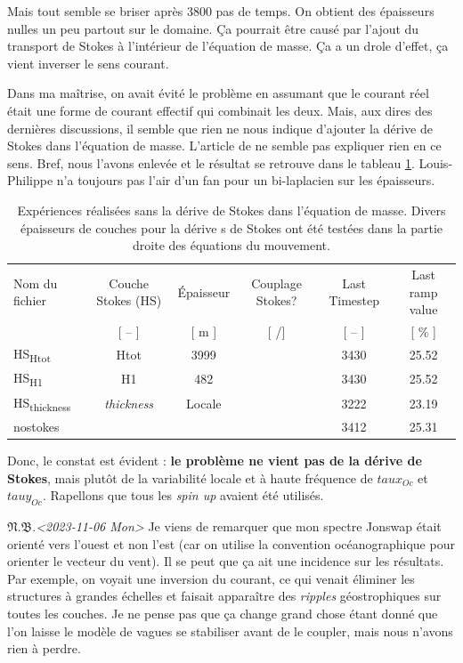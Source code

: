 \documentclass[10pt]{article}
\numberwithin{equation}{section}
\newcommand{\pt}{\hspace{1pt}} %
\newcommand{\nb}{\underline{{\footnotesize\EightStarConvex}\pt $\mathfrak{N.B.}$\vphantom{p}}\hspace{3pt}}
\newcommand{\cmark}{\ding{52}}
\newcommand{\xmark}{\ding{55}}
\begin{document}
Mais tout semble se briser après 3800 pas de temps.
On obtient des épaisseurs nulles un peu partout sur le domaine.
Ça pourrait être causé par l'ajout du transport de Stokes à l'intérieur de l'équation de masse.
Ça a un drole d'effet, ça vient inverser le sens courant. \bigskip

Dans ma maîtrise, on avait évité le problème en assumant que le courant réel était une forme de courant effectif qui combinait les deux.
Mais, aux dires des dernières discussions, il semble que rien ne nous indique d'ajouter la dérive de Stokes dans l'équation de masse.
L'article de \Textcite{suzuki2016understanding} ne semble pas expliquer rien en ce sens.
Bref, nous l'avons enlevée et le résultat se retrouve dans le tableau \ref{tab:org231c57c}.
Louis-Philippe n'a toujours pas l'air d'un fan pour un bi-laplacien sur les épaisseurs.

\begin{table}[htbp]
\caption{\label{tab:org231c57c}Expériences réalisées sans la dérive de Stokes dans l'équation de masse. Divers épaisseurs de couches pour la dérive s de Stokes ont été testées dans la partie droite des équations du mouvement.}
\centering
\begin{tabular}{lccccc}
\hline
\hline
Nom du fichier & Couche Stokes (HS) & Épaisseur & Couplage Stokes? & Last Timestep & Last ramp value\\[0pt]
[ -- ] & [ -- ] & [ m ] & [ \cmark/\xmark ] & [ -- ] & [ \% ]\\[0pt]
\hline
HS\textsubscript{Htot} & Htot & 3999 & \cmark & 3430 & 25.52\\[0pt]
HS\textsubscript{H1} & H1 & 482 & \cmark & 3430 & 25.52\\[0pt]
HS\textsubscript{thickness} & \emph{thickness} & Locale & \cmark & 3222 & 23.19\\[0pt]
nostokes & \xmark & \xmark & \xmark & 3412 & 25.31\\[0pt]
\hline
\end{tabular}
\end{table}

Donc, le constat est évident : \textbf{le problème ne vient pas de la dérive de Stokes}, mais plutôt de la variabilité locale et à haute fréquence de \(taux_{Oc}\) et \(tauy_{Oc}\).
Rapellons que tous les \emph{spin up} avaient été utilisés. \bigskip

\nb \textit{<2023-11-06 Mon> } Je viens de remarquer que mon spectre Jonswap était orienté vers l'ouest et non l'est (car on utilise la convention océanographique pour orienter le vecteur du vent).
Il se peut que ça ait une incidence sur les résultats.
Par exemple, on voyait une inversion du courant, ce qui venait éliminer les structures à grandes échelles et faisait apparaître des \emph{ripples} géostrophiques sur toutes les couches.
Je ne pense pas que ça change grand chose étant donné que l'on laisse le modèle de vagues se stabiliser avant de le coupler, mais nous n'avons rien à perdre. 
\end{document}
